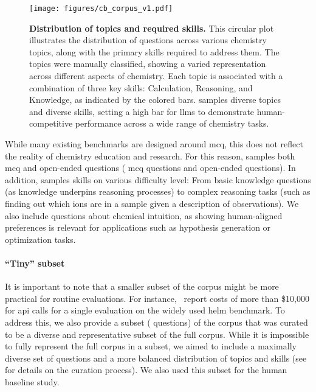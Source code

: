\documentclass[11pt, oneside]{article}
\begin{document}
\begin{refsection}
\begin{figure}[!htb]
    \centering
    \texttt{[image: figures/cb\_corpus\_v1.pdf]}
    \caption{\textbf{Distribution of topics and required skills.} This circular plot illustrates the distribution of questions across various chemistry topics, along with the primary skills required to address them. The topics were manually classified, showing a varied representation across different aspects of chemistry. Each topic is associated with a combination of three key skills: Calculation, Reasoning, and Knowledge, as indicated by the colored bars. \chembench samples diverse topics and diverse skills, setting a high bar for \glspl{llm} to demonstrate human-competitive performance across a wide range of chemistry tasks.}
    \label{fig:corpus}
\end{figure}


While many existing benchmarks are designed around \gls{mcq}, this does not reflect the reality of chemistry education and research.
For this reason, \chembench samples both \gls{mcq} and open-ended questions ( \gls{mcq} questions and  open-ended questions). In addition, \chembench samples skills on various difficulty level: From basic knowledge questions (as knowledge underpins reasoning processes\autocite{hu2024towards}) to complex reasoning tasks (such as finding out which ions are in a sample given a description of observations). We also include questions about chemical intuition, as showing human-aligned preferences is relevant for applications such as hypothesis generation or optimization tasks.\autocite{zhang2024omniopenendednessmodelshuman}


\paragraph{\enquote{Tiny} subset}
It is important to note that a smaller subset of the corpus might be more practical for routine evaluations.\autocite{polo2024tinybenchmarks}
For instance,~\textcite{liang2023holistic} report costs of more than \$10,000 for \gls{api} calls for a single evaluation on the widely used \gls{helm} benchmark. 
To address this, we also provide a subset ( questions) of the corpus that was curated to be a diverse and representative subset of the full corpus. While it is impossible to fully represent the full corpus in a subset, we aimed to include a maximally diverse set of questions and a more balanced distribution of topics and skills (see  for details on the curation process).
We also used this subset for the human baseline study. 




\end{refsection}
\end{document}
